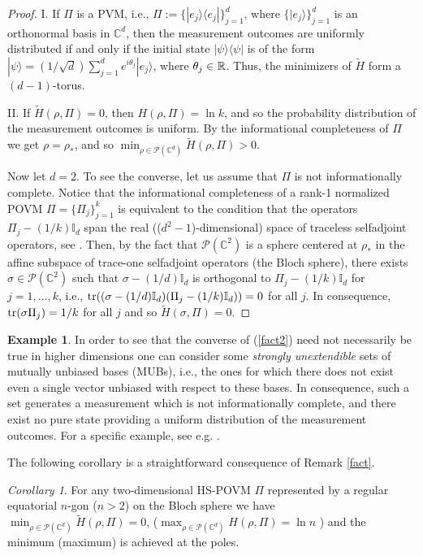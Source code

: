 \documentclass[11pt]{article}
\theoremstyle{remark}
\newtheorem{Cor}[Th]{Corollary}
\theoremstyle{definition}
\newtheorem*{Ex}{Example}
\def\tr{\textnormal{tr}}
\begin{document}
\begin{proof}\hfill
	
	\noindent I. If $\Pi$ is a PVM, i.e., $\Pi:=\{|e_j\rangle\langle e_j|\}_{j=1}^d$, where $\{|e_j\rangle\}_{j=1}^d$ is an orthonormal basis in $\mathbb C^d$, then the measurement outcomes are uniformly distributed if and only if the initial state $|\psi\rangle\langle\psi|$ is of the form $|\psi\rangle=(1/\sqrt d)\sum_{j=1}^de^{i\theta_j}|e_j\rangle$, where $\theta_j\in\nolinebreak\mathbb R$. Thus, the minimizers of $\tilde{H}$ form a $(d-1)$-torus.
	
	\noindent II. If $\widetilde H(\rho,\Pi)=0$, then $H(\rho,\Pi)=\ln k$, and so the probability distribution of the measurement outcomes is uniform. By the informational completeness of $\Pi$ we get  $\rho=\rho_*$, and so $\min_{\rho\in\mathcal P(\mathbb C^d)} \widetilde H(\rho,\Pi)>0$.
	
	Now let $d=2$. To see the converse, let us assume that $\Pi$ is not informationally complete. Notice that the informational completeness of a rank-1 normalized POVM $\Pi=\{\Pi_j\}_{j=1}^k$ is equivalent to the condition that the operators $\Pi_j-(1/k)\mathbb I_d$ span the real (($d^2-1$)-dimensional) space of traceless selfadjoint operators, see \cite[Prop.\ 3.51]{HeiZim}.  Then, by the fact that $\mathcal P(\mathbb C^2)$ is a sphere centered at $\rho_*$ in the affine subspace of trace-one selfadjoint operators (the Bloch sphere), there exists  $\sigma\in \mathcal P(\mathbb C^2)$ such that $\sigma-(1/d)\mathbb I_d $ is orthogonal to $\Pi_j-(1/k)\mathbb I_d$ for  $j=1,\ldots,k$, i.e., $\tr((\sigma-(1/d)\mathbb I_d)(\Pi_j-(1/k)\mathbb I_d))=0$ for all $j$. In consequence, $\tr(\sigma\Pi_j)=1/k$ for all $j$ and so $\widetilde H(\sigma,\Pi)=0$.
\end{proof}

\begin{Ex}
	In order to see that  the converse of (\ref{fact2}) need not necessarily be true in higher dimensions one can consider some  \emph{strongly unextendible} sets of mutually unbiased bases (MUBs), i.e., the ones for which there does not exist even a single vector unbiased with respect to these bases. In consequence, such a set generates a measurement which is not informationally complete, and there exist no pure state providing a uniform distribution of the measurement outcomes. For a specific example, see e.g. \cite[Thm 2]{Gra04}.
\end{Ex}

The following corollary is a straightforward consequence of Remark \ref{fact}.
\begin{Cor}
	For any two-dimensional HS-POVM $\Pi$ represented by a regular equatorial $n$-gon ($n>2$) on the Bloch sphere we have $\min_{\rho\in\mathcal P(\mathbb C^d)}\widetilde{H}(\rho,\Pi)=0$, ($\max_{\rho\in\mathcal P(\mathbb C^d)} H(\rho,\Pi)=\ln n$ ) and the minimum (maximum) is achieved at the poles.
\end{Cor} 
\end{document}
